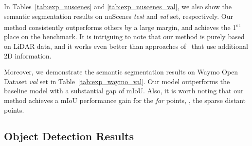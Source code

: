 \documentclass[10pt,twocolumn,letterpaper]{article}
\begin{document}
In Tables~\ref{tab:exp_nuscenes} and \ref{tab:exp_nuscenes_val}, we also show the semantic segmentation results on nuScenes \textit{test} and \textit{val} set, respectively. Our method consistently outperforms others by a large margin, and achieves the 1\textsuperscript{st} place on the benchmark. It is intriguing to note that our method is purely based on LiDAR data, and it works even better than approaches of~\cite{zhuang2021perception,genova2021learning,yan20222dpass} that use additional 2D information.

Moreover, we demonstrate the semantic segmentation results on Waymo Open Dataset \textit{val} set in Table~\ref{tab:exp_waymo_val}. Our model outperforms the baseline model with a substantial gap of  mIoU. Also, it is worth noting that our method achieves a  mIoU performance gain for the \textit{far} points, \ie, the sparse distant points.

\subsection{Object Detection Results}
\label{sec:det}
\end{document}
